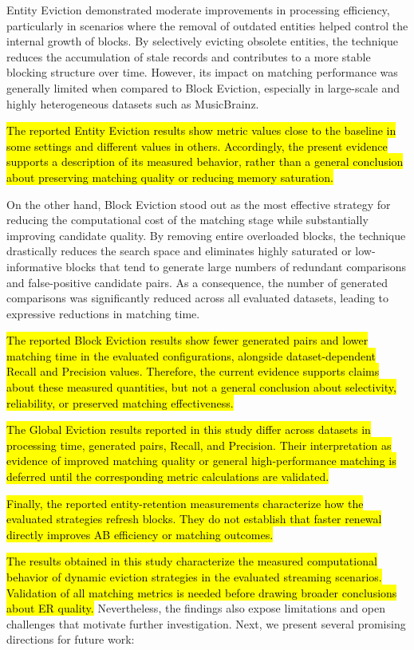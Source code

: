 \documentclass{ieeeaccess}
\begin{document}
Entity Eviction demonstrated moderate improvements in processing efficiency, particularly in scenarios where the removal of outdated entities helped control the internal growth of blocks. By selectively evicting obsolete entities, the technique reduces the accumulation of stale records and contributes to a more stable blocking structure over time. However, its impact on matching performance was generally limited when compared to Block Eviction, especially in large-scale and highly heterogeneous datasets such as MusicBrainz.

\hl{The reported Entity Eviction results show metric values close to the baseline in some settings and different values in others. Accordingly, the present evidence supports a description of its measured behavior, rather than a general conclusion about preserving matching quality or reducing memory saturation.}

On the other hand, Block Eviction stood out as the most effective strategy for reducing the computational cost of the matching stage while substantially improving candidate quality. By removing entire overloaded blocks, the technique drastically reduces the search space and eliminates highly saturated or low-informative blocks that tend to generate large numbers of redundant comparisons and false-positive candidate pairs. As a consequence, the number of generated comparisons was significantly reduced across all evaluated datasets, leading to expressive reductions in matching time.

\hl{The reported Block Eviction results show fewer generated pairs and lower matching time in the evaluated configurations, alongside dataset-dependent Recall and Precision values. Therefore, the current evidence supports claims about these measured quantities, but not a general conclusion about selectivity, reliability, or preserved matching effectiveness.}

\hl{The Global Eviction results reported in this study differ across datasets in processing time, generated pairs, Recall, and Precision. Their interpretation as evidence of improved matching quality or general high-performance matching is deferred until the corresponding metric calculations are validated.}

\hl{Finally, the reported entity-retention measurements characterize how the evaluated strategies refresh blocks. They do not establish that faster renewal directly improves AB efficiency or matching outcomes.}

\hl{The results obtained in this study characterize the measured computational behavior of dynamic eviction strategies in the evaluated streaming scenarios. Validation of all matching metrics is needed before drawing broader conclusions about ER quality.} Nevertheless, the findings also expose limitations and open challenges that motivate further investigation. Next, we present several promising directions for future work:
\end{document}
